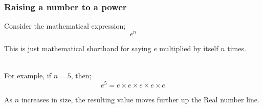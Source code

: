\begin{frame}[t]

	\frametitle{Raising a number to a power}

	Consider the mathematical expression;
	\begin{equation} \label{eqn_slide_8_a}
	e^{n}
	\end{equation}

	This is just mathematical shorthand for saying \(e\) multiplied by itself \(n\) times.\\~

	For example, if \(n = 5\), then;
	\begin{equation} \label{eqn_slide_8_b}
	e^{5} = e \times e \times e \times e \times e
	\end{equation}

	As \(n\) increases in size, the resulting value moves further up the Real number line.\\~

\end{frame}
